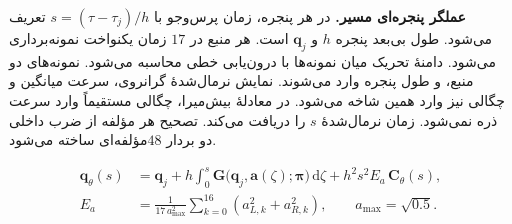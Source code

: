 \textbf{عملگر پنجره‌ای مسیر.}
در هر پنجره، زمان پرس‌وجو با $s=(\tau-\tau_j)/h$ تعریف می‌شود.
طول بی‌بعد پنجره $h$ و  $\mathbf q_j$ است.
هر منبع در $17$ زمان یکنواخت نمونه‌برداری می‌شود.
دامنهٔ تحریک میان نمونه‌ها با درون‌یابی خطی محاسبه می‌شود.
نمونه‌های دو منبع،  و طول پنجره وارد  می‌شوند.
نمایش نرمال‌شدهٔ گرانروی، سرعت میانگین و چگالی نیز وارد همین شاخه می‌شود.
در معادلهٔ بیش‌میرا، چگالی مستقیماً وارد سرعت ذره نمی‌شود.
 زمان نرمال‌شدهٔ $s$ را دریافت می‌کند.
تصحیح هر مؤلفه از ضرب داخلی دو بردار $48$مؤلفه‌ای ساخته می‌شود.

\begin{equation}
\begin{aligned}
\mathbf q_\theta(s)&=
\mathbf q_j+
h\int_0^s \mathbf G\big(\mathbf q_j,\mathbf a(\zeta);\boldsymbol\pi\big)\,\mathrm d\zeta
+h^2s^2E_a\,\mathbf C_\theta(s),\\
E_a&=\frac{1}{17\,a_{\max}^2}
\sum_{k=0}^{16}(a_{L,k}^2+a_{R,k}^2),
\qquad a_{\max}=\sqrt{0.5}.
\end{aligned}
\label{eq:forward-mag-window}
\end{equation}

